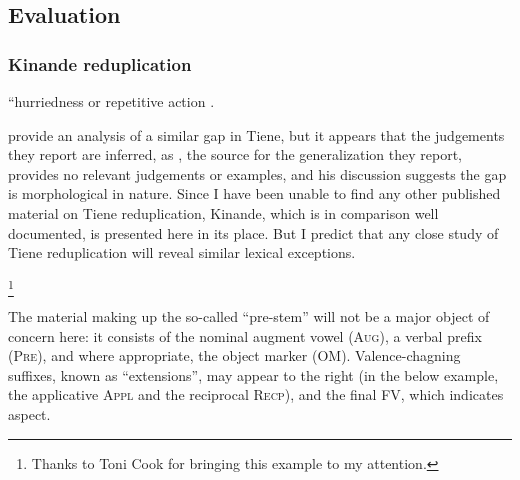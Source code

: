 \subsection{Evaluation}



\citet{Orgun1999}
\citet{Orgun2009}

\citet{Ito1989b}

\subsubsection{Kinande reduplication}

``hurriedness or repetitive action \citep[][85; henceforth, MH]{Mutaka1990}.

\citet{Orgun1999} provide an analysis of a similar gap in Tiene, but it appears that the judgements they report are inferred, as \citet{Ellington1977}, the source for the generalization they report, provides no relevant judgements or examples, and his discussion suggests the gap is morphological in nature.
Since I have been unable to find any other published material on Tiene reduplication, Kinande, which is in comparison well documented, is presented here in its place.
But I predict that any close study of Tiene reduplication will reveal similar lexical exceptions.

\footnote{Thanks to Toni Cook for bringing this example to my attention.}

The material making up the so-called ``pre-stem'' will not be a major object of concern here: it consists of the nominal augment vowel (\textsc{Aug}), a verbal prefix (\textsc{Pre}), and where appropriate, the object marker (\textsc{OM}). Valence-chagning suffixes, known as ``extensions'', may appear to the right (in the below example, the applicative \textsc{Appl} and the reciprocal \textsc{Recp}), and the final \textsc{FV}, which indicates aspect. 

